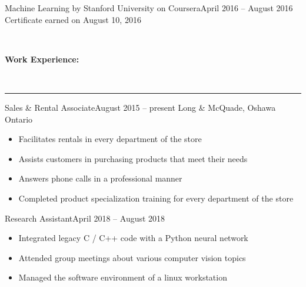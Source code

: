 \documentclass[]{article}
\makeatletter
\newcommand{\heading}[1]
{\begin{large}\textbf{#1}\end{large}\\%
 \rule[1.2ex]{\linewidth}{0.4pt}}
\newenvironment{*subsection}[2]
{
\begin{tabu} to \linewidth {@{}X[l] r}
  \textbf{#1} &
  \textbf{#2}
\end{tabu}
}
{
  \vspace{3mm}
}
\makeatother
\begin{document}
\begin{*subsection}{Machine Learning by Stanford University on Coursera}{April 2016 -- August 2016}%
  Certificate earned on August 10, 2016
\end{*subsection}
\\
\heading{Work Experience:}
\begin{*subsection}{Sales \& Rental Associate}{August 2015 -- present}
  Long \& McQuade, Oshawa Ontario
  \begin{itemize}
    \item Facilitates rentals in every department of the store
    \item Assists customers in purchasing products that meet their needs
    \item Answers phone calls in a professional manner
    \item Completed product specialization training for every department of the store
  \end{itemize}
\end{*subsection}
%
\begin{*subsection}{Research Assistant}{April 2018 -- August 2018}
  \begin{itemize}
    \item Integrated legacy C / C++ code with a Python neural network
    \item Attended group meetings about various computer vision topics
    \item Managed the software environment of a linux workstation
  \end{itemize}
\end{*subsection}
%
\end{document}
